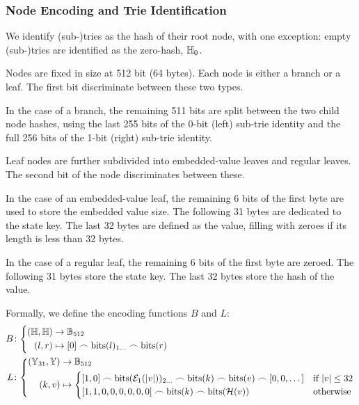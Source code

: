 \subsubsection{Node Encoding and Trie Identification}
We identify (sub-)tries as the hash of their root node, with one exception: empty (sub-)tries are identified as the zero-hash, $\mathbb{H}_0$.

Nodes are fixed in size at 512 bit (64 bytes). Each node is either a branch or a leaf. The first bit discriminate between these two types.

In the case of a branch, the remaining 511 bits are split between the two child node hashes, using the last 255 bits of the 0-bit (left) sub-trie identity and the full 256 bits of the 1-bit (right) sub-trie identity.

Leaf nodes are further subdivided into embedded-value leaves and regular leaves. The second bit of the node discriminates between these.

In the case of an embedded-value leaf, the remaining 6 bits of the first byte are used to store the embedded value size. The following 31 bytes are dedicated to the state key. The last 32 bytes are defined as the value, filling with zeroes if its length is less than 32 bytes.

In the case of a regular leaf, the remaining 6 bits of the first byte are zeroed. The following 31 bytes store the state key. The last 32 bytes store the hash of the value.

Formally, we define the encoding functions $B$ and $L$:
\begin{align}
  B&\colon\left\{\begin{aligned}
    (\hash, \hash) &\to \mathbb{B}_{512}\\
    (l, r) &\mapsto [0] \concat \text{bits}(l)_{1\dots} \concat \text{bits}(r)
  \end{aligned}\right.\\
  L&\colon\left\{\begin{aligned}
    (\blob_{31}, \blob) &\to \mathbb{B}_{512}\\
    (k, v) &\mapsto \begin{cases}
      [1, 0] \concat \text{bits}(\se_1(\len{v}))_{2\dots} \concat \text{bits}(k) \concat \text{bits}(v) \concat [0, 0, \dots] &\when \len{v} \le 32\\
      [1, 1, 0, 0, 0, 0, 0, 0] \concat \text{bits}(k) \concat \text{bits}(\blake(v)) &\otherwise
    \end{cases}
  \end{aligned}\right.
\end{align}

